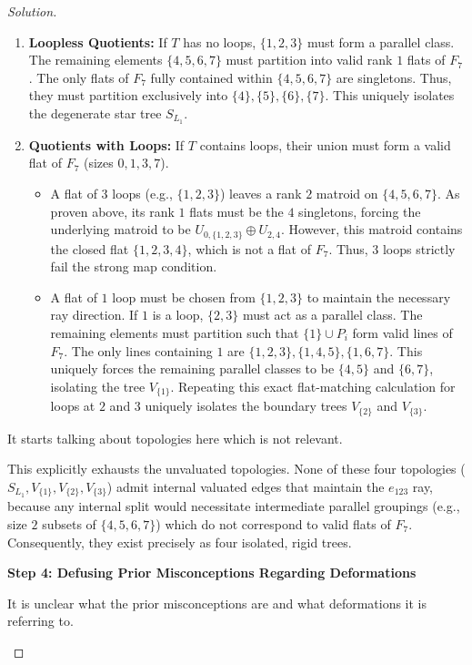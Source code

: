 \documentclass[12pt]{article}
\newcommand{\review}[1]{\begin{reviewbox}#1\end{reviewbox}}
\begin{document}
\begin{proof}[Solution]
\begin{enumerate}
    \item \textbf{Loopless Quotients:} If $T$ has no loops, $\{1,2,3\}$ must form a parallel class. The remaining elements $\{4,5,6,7\}$ must partition into valid rank $1$ flats of $F_7$. The only flats of $F_7$ fully contained within $\{4,5,6,7\}$ are singletons. Thus, they must partition exclusively into $\{4\}, \{5\}, \{6\}, \{7\}$. This uniquely isolates the degenerate star tree $S_{L_1}$.
    \item \textbf{Quotients with Loops:} If $T$ contains loops, their union must form a valid flat of $F_7$ (sizes $0, 1, 3, 7$). 
    \begin{itemize}
        \item A flat of $3$ loops (e.g., $\{1,2,3\}$) leaves a rank $2$ matroid on $\{4,5,6,7\}$. As proven above, its rank $1$ flats must be the $4$ singletons, forcing the underlying matroid to be $U_{0,\{1,2,3\}} \oplus U_{2,4}$. However, this matroid contains the closed flat $\{1,2,3,4\}$, which is not a flat of $F_7$. Thus, $3$ loops strictly fail the strong map condition.
        \item A flat of $1$ loop must be chosen from $\{1,2,3\}$ to maintain the necessary ray direction. If $1$ is a loop, $\{2,3\}$ must act as a parallel class. The remaining elements must partition such that $\{1\} \cup P_i$ form valid lines of $F_7$. The only lines containing $1$ are $\{1,2,3\}, \{1,4,5\}, \{1,6,7\}$. This uniquely forces the remaining parallel classes to be $\{4,5\}$ and $\{6,7\}$, isolating the tree $V_{\{1\}}$. Repeating this exact flat-matching calculation for loops at $2$ and $3$ uniquely isolates the boundary trees $V_{\{2\}}$ and $V_{\{3\}}$.
    \end{itemize}
\end{enumerate}
\review{It starts talking about topologies here which is not relevant. }
This explicitly exhausts the unvaluated topologies. None of these four topologies ($S_{L_1}, V_{\{1\}}, V_{\{2\}}, V_{\{3\}}$) admit internal valuated edges that maintain the $e_{123}$ ray, because any internal split would necessitate intermediate parallel groupings (e.g., size $2$ subsets of $\{4,5,6,7\}$) which do not correspond to valid flats of $F_7$. Consequently, they exist precisely as four isolated, rigid trees.

\medskip
\noindent \textbf{Step 4: Defusing Prior Misconceptions Regarding Deformations}

\review{It is unclear what the prior misconceptions are and what deformations it is referring to.}


\end{proof}
\end{document}
